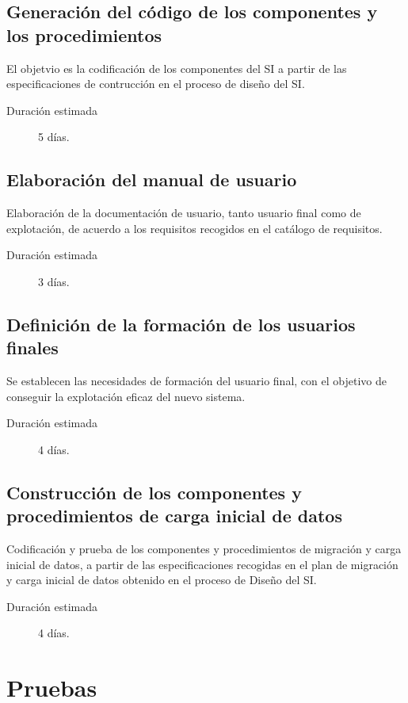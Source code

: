 \documentclass[11pt,a4paper,spanish,twoside]{report}
\begin{document}
\subsection{Generación del código de los componentes y los procedimientos}
El objetvio es la codificación de los componentes del SI a
  partir de las especificaciones de contrucción en el proceso de diseño del SI.
\begin{description}
\item[Duración estimada] 5 días.
\end{description}

\subsection{Elaboración del manual de usuario}
Elaboración de la documentación de usuario, tanto usuario final como de
explotación, de acuerdo a los requisitos recogidos en el catálogo de
requisitos. 
\begin{description}
\item[Duración estimada] 3 días.
\end{description}

\subsection{Definición de la formación de los usuarios finales}
Se establecen las necesidades de formación del usuario final, con el objetivo
de conseguir la explotación eficaz del nuevo sistema. 
\begin{description}
\item[Duración estimada] 4 días.
\end{description}

\subsection{Construcción de los componentes y procedimientos de 
carga inicial de datos} 
Codificación y prueba de los componentes y procedimientos de migración y
carga inicial de datos, a partir de las especificaciones recogidas en el plan
de migración y carga inicial de datos obtenido en el proceso de Diseño del
SI. 
\begin{description}
\item[Duración estimada] 4 días.
\end{description}

\section{Pruebas}
\end{document}
